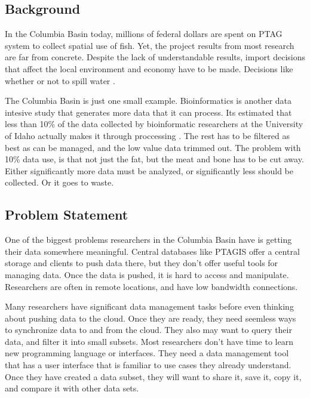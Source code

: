 \subsection{Background}
In the Columbia Basin today, millions of federal dollars are spent on PTAG
system \cite{something} to collect spatial use of fish. Yet, the project 
results from most research are far from concrete. Despite the lack of 
understandable results, import decisions that affect the local environment and 
economy have to be made. Decisions like whether or not to spill water 
\cite{Ice Harbor/ McNary 2005}. 

The Columbia Basin is just one small example. Bioinformatics is another 
data intesive study that generates more data that it can process. Its 
estimated that less than 10\% of the data collected by bioinformatic 
researchers at the University of Idaho actually makes it through proccessing
\cite{foster}. The rest has to be filtered as best as can be managed, and the 
low value data trimmed out. The problem with 10\% data use, is that not just 
the fat, but the meat and bone has to be cut away. Either significantly more
data must be analyzed, or significantly less should be collected. Or it goes
to waste.

\subsection{Problem Statement}
One of the biggest problems researchers in the Columbia Basin have is getting
their data somewhere meaningful. Central databases like PTAGIS offer a 
central storage and clients to push data there, but they don't offer useful
tools for managing data. Once the data is pushed, it is hard to access and
manipulate. Researchers are often in remote locations, and have low bandwidth
connections. 

Many researchers have significant data management tasks before even thinking 
about pushing data to the cloud. Once they are ready, they need seemless ways to
synchronize data to and from the cloud. They also may want to query their data,
and filter it into small subsets. Most researchers don't have time to learn
new programming language or interfaces. They need a data management tool 
that has a user 
interface that is familiar to use cases they already understand. Once they
have created a data subset, they will want to share it, save it, copy it, 
and compare it with other data sets. 

